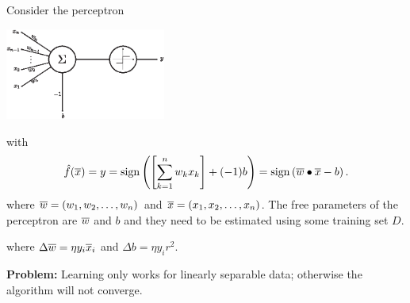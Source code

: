 \documentclass[a4paper,blends,pdf,colorBG,slideColor]{prosper}
\begin{document}
Consider the perceptron
\begin{center}
\includegraphics[height=30mm]{figures/fig05-01.eps}
\end{center}
with
\[
\model{f}(\ol{x})= y = \sign\left(\left[\sum_{k=1}^n w_k x_k\right] + (-1) b\right) = \sign\left(\ol{w}\bullet\ol{x} - b\right).
\]
where $\overline{w} = (w_1, w_2, \ldots, w_n)$ and $\overline{x} = (x_1, x_2,\ldots,x_n)$.
The free parameters of the perceptron are $\overline{w}$ and $b$ and they need to be
estimated using some training set $D$.

\es


\begin{center}
\end{center}
where $\Delta \overline{w} =  \eta y_i \overline{x}_i$ and $\Delta b = \eta y_i r^2$.
\es


{\bf Problem:} Learning only works for linearly separable data; otherwise the algorithm will not converge.
\end{document}
